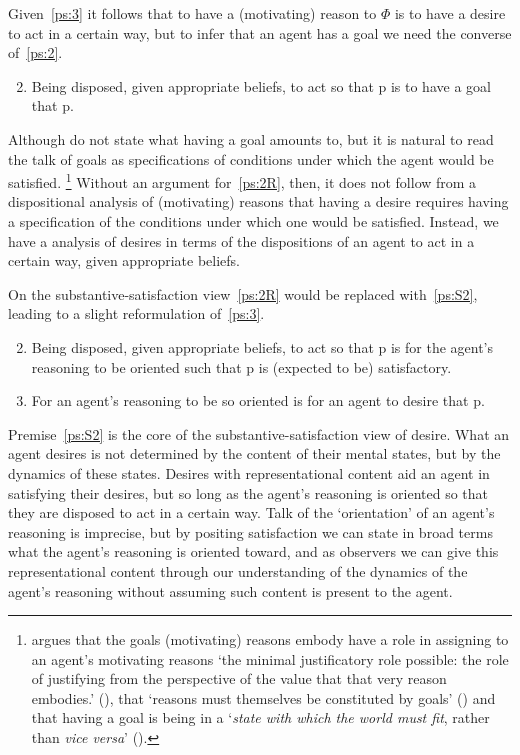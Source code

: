 \documentclass[10pt]{article}
\begin{document}
Given~\ref{ps:3} it follows that to have a (motivating) reason to \(\Phi\) is to have a desire to act in a certain way, but to infer that an agent has a goal we need the converse of~\ref{ps:2}.
\begin{enumerate}[label=\arabic*\('\)., ref=(\arabic*\('\))]\setcounter{enumi}{1}
\item\label{ps:2R} Being disposed, given appropriate beliefs, to act so that p is to have a goal that p.
\end{enumerate}
Although \citeauthor{Pettit:1990aa} do not state what having a goal amounts to, but it is natural to read the talk of goals as specifications of conditions under which the agent would be satisfied.\nolinebreak
\footnote{
  \citeauthor{Smith:1987aa} argues that the goals (motivating) reasons embody have a role in assigning to an agent's motivating reasons `the minimal justificatory role possible: the role of justifying from the perspective of the value that that very reason embodies.'  (\citeyear[38--39]{Smith:1987aa}), that `reasons must themselves be constituted by goals' (\citeyear[45]{Smith:1987aa}) and that having a goal is being in a `\emph{state with which the world must fit}, rather than \emph{vice versa}' (\citeyear[54]{Smith:1987aa}).
}
Without an argument for~\ref{ps:2R}, then, it does not follow from a dispositional analysis of (motivating) reasons that having a desire requires having a specification of the conditions under which one would be satisfied.
Instead, we have a analysis of desires in terms of the dispositions of an agent to act in a certain way, given appropriate beliefs.

On the substantive-satisfaction view~\ref{ps:2R} would be replaced with~\ref{ps:S2}, leading to a slight reformulation of~\ref{ps:3}.
\begin{enumerate}[label=\arabic*\(''\)., ref=(\arabic*\(''\))]\setcounter{enumi}{1}
\item\label{ps:S2} Being disposed, given appropriate beliefs, to act so that p is for the agent's reasoning to be oriented such that p is (expected to be) satisfactory.
\item\label{ps:S3} For an agent's reasoning to be so oriented is for an agent to desire that p.
\end{enumerate}
Premise~\ref{ps:S2} is the core of the substantive-satisfaction view of desire.
What an agent desires is not determined by the content of their mental states, but by the dynamics of these states.
Desires with representational content aid an agent in satisfying their desires, but so long as the agent's reasoning is oriented so that they are disposed to act in a certain way.
Talk of the `orientation' of an agent's reasoning is imprecise, but by positing satisfaction we can state in broad terms what the agent's reasoning is oriented toward, and as observers we can give this representational content through our understanding of the dynamics of the agent's reasoning without assuming such content is present to the agent.
\end{document}
